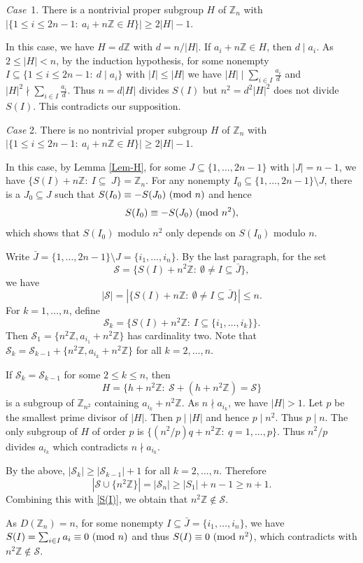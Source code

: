 \documentclass[11pt,reqno]{amsart}
\def\pmod #1{\ ({\rm{mod}}\ #1)}
\def\Z{\mathbb Z}
\def\f{\frac}
\def\ls{\leqslant}
\def\gs{\geqslant}
\def\se {\subseteq}
\def\sm{\setminus}
\def\eq{\equiv}
\theoremstyle{plain}
\theoremstyle{definition}
\theoremstyle{remark}
\begin{document}
{\it Case}\ 1. There is a nontrivial proper subgroup $H$ of $\Z_n$ with $|\{1\ls i\ls 2n-1:\
a_i+n\Z\in H\}|\gs 2|H|-1$.

In this case, we have $H=d\Z$ with $d=n/|H|$. If $a_i+n\Z\in H$, then $d\mid a_i$.
As $2\ls |H|<n$, by the induction hypothesis, for some nonempty $I\se\{1\ls i\ls 2n-1:\ d\mid a_i\}$
with $|I|\ls |H|$ we have
$|H|\mid \sum_{i\in I}\f{a_i}d$ and $|H|^2\nmid \sum_{i\in I}\f{a_i}d$.
Thus $n=d|H|$ divides $S(I)$ but $n^2=d^2|H|^2$ does not divide $S(I)$.
This contradicts our supposition.

{\it Case} 2. There is no nontrivial proper subgroup $H$ of $\Z_n$ with $|\{1\ls i\ls 2n-1:\
a_i+n\Z\in H\}|\gs 2|H|-1$.

In this case, by Lemma \ref{Lem-H}, for some $J\se\{1,\ldots,2n-1\}$ with $|J|=n-1$, we have
$\{S(I)+n\Z:\ I\se\ J\}=\Z_n$.
For any nonempty $I_0\se\{1,\ldots,2n-1\}\sm J$, there is a $J_0\se J$ such that
$S(I_0)\eq-S(J_0)\pmod n$ and hence
$$S(I_0)\eq-S(J_0)\pmod {n^2},$$
which shows that $S(I_0)$ modulo $n^2$ only depends on $S(I_0)$
modulo $n$.

Write $\bar J=\{1,\ldots,2n-1\}\sm J=\{i_1,\ldots,i_n\}$. By the last paragraph, for the set
$${\mathcal S}=\{S(I)+n^2\Z:\ \emptyset \not=I\se \bar J\},$$
we have
\begin{equation}\label{S(I)}
|{\mathcal S}|=|\{S(I)+n\Z:\ \emptyset \not=I\se\bar J\}|\ls n.
\end{equation}
For $k=1,\ldots,n$, define
$${\mathcal S}_k=\{S(I)+n^2\Z:\ I\se\{i_1,\ldots,i_k\}\}.$$
Then ${\mathcal S}_1=\{n^2\Z,a_{i_1}+n^2\Z\}$ has cardinality two.
Note that ${\mathcal S_{k}}={\mathcal S}_{k-1}+\{n^2\Z,a_{i_k}+n^2\Z\}$
for all $k=2,\ldots,n$.

 If ${\mathcal S}_k={\mathcal S}_{k-1}$ for some $2\ls k\ls n$,
then
$$ H=\{h+n^2\Z:\ {\mathcal S}+(h+n^2\Z)={\mathcal S}\}$$
is a subgroup of $\Z_{n^2}$ containing $a_{i_k}+n^2\Z$.
As $n\nmid a_{i_k}$, we have $|H|>1$. Let $p$ be the smallest prime divisor of $|H|$.
Then $p\mid |H|$ and hence $p\mid n^2$. Thus $p\mid n$. The only subgroup of $H$
of order $p$ is $\{(n^2/p)q+n^2\Z:\ q=1,\ldots,p\}$. Thus $n^2/p$ divides $a_{i_k}$
which contradicts $n\nmid a_{i_k}$.

By the above, $|{\mathcal S}_k|\gs |\mathcal S_{k-1}|+1$ for all $k=2,\ldots,n$.
Therefore
$$|{\mathcal S}\cup\{n^2\Z\}|=|{\mathcal S}_n|\gs|S_1|+n-1\gs n+1.$$
Combining this with \eqref{S(I)}, we obtain that $n^2\Z\not\in {\mathcal S}$.

As $D(\Z_n)=n$, for some nonempty $I\se \bar J=\{i_1,\ldots,i_{n}\}$, we have $S(I)=\sum_{i\in I}a_i\eq0\pmod n$
and thus $S(I)\eq0\pmod{n^2}$, which contradicts with $n^2\Z\not\in {\mathcal S}$.
\end{document}
